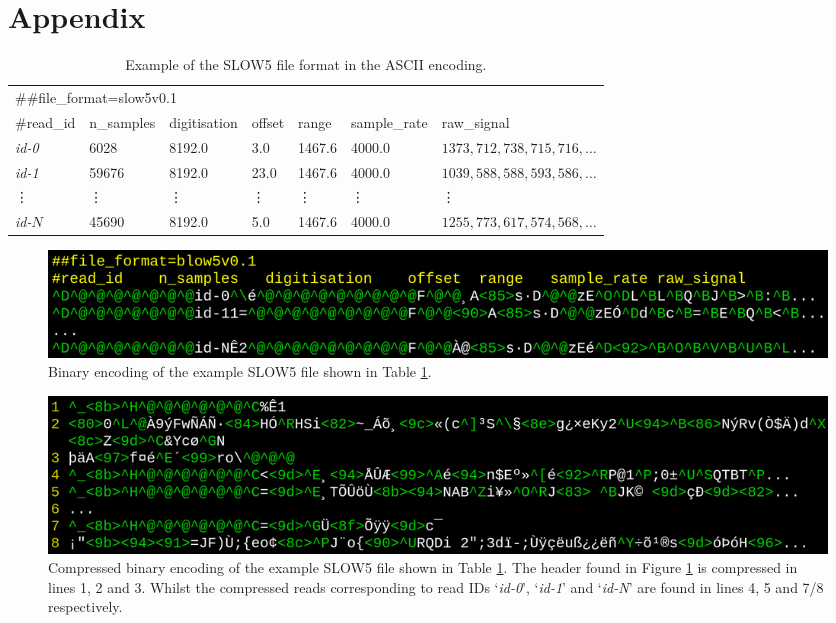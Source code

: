 \section{Appendix}

\begin{table}[h!]
    \caption{Example of the SLOW5 file format in the ASCII encoding.\label{tab:slow5}}
    \begin{tabular}{|*{7}{l}|}
        \hline
        \multicolumn{7}{|l|}{\#\#file\_format=slow5v0.1} \\
        \#read\_id & n\_samples & digitisation & offset & range & sample\_rate & raw\_signal \\
            \textit{id-0} & 6028 & 8192.0 & 3.0 & 1467.6 & 4000.0 & $1373,712,738,715,716,\dots$ \\
                    \textit{id-1} & 59676 & 8192.0 & 23.0 & 1467.6 & 4000.0 & $1039,588,588,593,586,\dots$ \\
                            \; \vdots & \; \vdots & \;\; \vdots & \; \vdots & \;\; \vdots & \;\; \vdots & \hspace{1cm} \vdots \\
                                    \textit{id-$N$} & 45690 & 8192.0 & 5.0 & 1467.6 & 4000.0 & $1255,773,617,574,568,\dots$ \\

        \hline
    \end{tabular}
\end{table}

\begin{figure}[h!]
	\includegraphics[width=1.5\linewidth]{../../img/blow5_nonum.png}
    \caption[Binary encoding of the example SLOW5 file shown in Table \ref{tab:slow5}.]{Binary encoding of the example SLOW5 file shown in Table \ref{tab:slow5}.\footnotemark}
	\label{tab:blow5}
\end{figure}

\begin{figure}[h!]
	\includegraphics[width=1.5\linewidth]{../../img/blow5gz_new.png}
    \caption[Compressed binary encoding of the example SLOW5 file shown in Table \ref{tab:slow5}.]{Compressed binary encoding of the example SLOW5 file shown in Table \ref{tab:slow5}. The header found in Figure \ref{tab:blow5} is compressed in lines 1, 2 and 3. Whilst the compressed reads corresponding to read IDs `\textit{id-0}', `\textit{id-1}' and `\textit{id-N}' are found in lines 4, 5 and 7/8 respectively.}
	\label{tab:blow5gz}
\end{figure}
